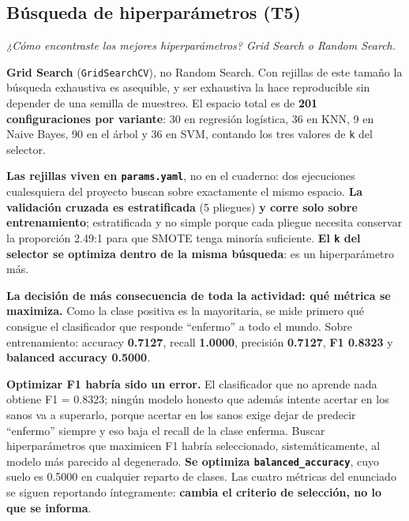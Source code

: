 \documentclass[10pt,a4paper]{article}
\begin{document}
\subsection{Búsqueda de hiperparámetros (T5)}

\textit{¿Cómo encontraste los mejores hiperparámetros? Grid Search o Random Search.}

\textbf{Grid Search} (\texttt{GridSearchCV}), no Random Search. Con rejillas de este tamaño la búsqueda exhaustiva es asequible, y ser exhaustiva la hace reproducible sin depender de una semilla de muestreo. El espacio total es de \textbf{201 configuraciones por variante}: 30 en regresión logística, 36 en KNN, 9 en Naive Bayes, 90 en el árbol y 36 en SVM, contando los tres valores de \texttt{k} del selector.

\textbf{Las rejillas viven en \texttt{params.yaml}}, no en el cuaderno: dos ejecuciones cualesquiera del proyecto buscan sobre exactamente el mismo espacio. \textbf{La validación cruzada es estratificada} (5 pliegues) \textbf{y corre solo sobre entrenamiento}; estratificada y no simple porque cada pliegue necesita conservar la proporción 2.49:1 para que SMOTE tenga minoría suficiente. \textbf{El \texttt{k} del selector se optimiza dentro de la misma búsqueda}: es un hiperparámetro más.

\textbf{La decisión de más consecuencia de toda la actividad: qué métrica se maximiza.} Como la clase positiva es la mayoritaria, se mide primero qué consigue el clasificador que responde ``enfermo'' a todo el mundo. Sobre entrenamiento: accuracy \textbf{0.7127}, recall \textbf{1.0000}, precisión \textbf{0.7127}, \textbf{F1 0.8323} y \textbf{balanced accuracy 0.5000}.

\textbf{Optimizar F1 habría sido un error.} El clasificador que no aprende nada obtiene F1 = 0.8323; ningún modelo honesto que además intente acertar en los sanos va a superarlo, porque acertar en los sanos exige dejar de predecir ``enfermo'' siempre y eso baja el recall de la clase enferma. Buscar hiperparámetros que maximicen F1 habría seleccionado, sistemáticamente, al modelo más parecido al degenerado. \textbf{Se optimiza \texttt{balanced\_accuracy}}, cuyo suelo es 0.5000 en cualquier reparto de clases. Las cuatro métricas del enunciado se siguen reportando íntegramente: \textbf{cambia el criterio de selección, no lo que se informa}.
\end{document}
